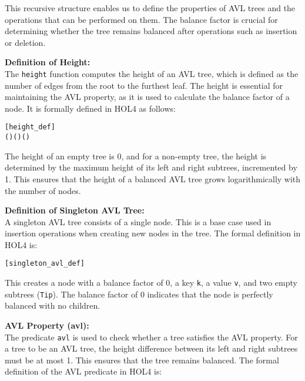 \documentclass[12pt]{article}
\begin{document}
This recursive structure enables us to define the properties of AVL trees and the operations that can be performed on them. The balance factor is crucial for determining whether the tree remains balanced after operations such as insertion or deletion.

\textbf{Definition of Height:} \\
The \texttt{height} function computes the height of an AVL tree, which is defined as the number of edges from the root to the furthest leaf. The height is essential for maintaining the AVL property, as it is used to calculate the balance factor of a node. It is formally defined in HOL4 as follows:

\begin{alltt}
[height_def]
  \HOLTokenDefEquality{} 
 (     ) \HOLTokenDefEquality{}  ( ) ( ) \HOLSymConst{\ensuremath{+}} 
\end{alltt}

The height of an empty tree is 0, and for a non-empty tree, the height is determined by the maximum height of its left and right subtrees, incremented by 1. This ensures that the height of a balanced AVL tree grows logarithmically with the number of nodes.

\textbf{Definition of Singleton AVL Tree:} \\
A singleton AVL tree consists of a single node. This is a base case used in insertion operations when creating new nodes in the tree. The formal definition in HOL4 is:

\begin{alltt}
[singleton_avl_def]
   \HOLTokenDefEquality{}      
\end{alltt}

This creates a node with a balance factor of 0, a key \texttt{k}, a value \texttt{v}, and two empty subtrees (\texttt{Tip}). The balance factor of 0 indicates that the node is perfectly balanced with no children.

\textbf{AVL Property (avl):} \\
The predicate \texttt{avl} is used to check whether a tree satisfies the AVL property. For a tree to be an AVL tree, the height difference between its left and right subtrees must be at most 1. This ensures that the tree remains balanced. The formal definition of the AVL predicate in HOL4 is:
\end{document}

